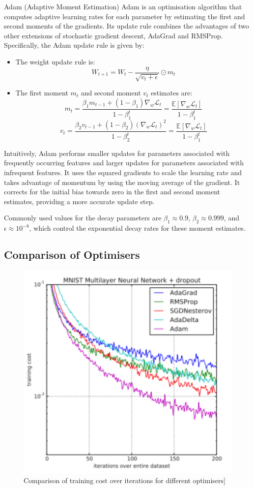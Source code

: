 \begin{definitionbox}{Adam (Adaptive Moment Estimation)}
Adam is an optimisation algorithm that computes adaptive learning rates for each parameter by estimating the first and second moments of the gradients. Its update rule combines the advantages of two other extensions of stochastic gradient descent, AdaGrad and RMSProp. Specifically, the Adam update rule is given by:
\begin{itemize}
    \item The weight update rule is:
    \[ W_{t+1} = W_t - \frac{\eta}{\sqrt{v_t + \epsilon}} \odot m_t \]
    \item The first moment \( m_t \) and second moment \( v_t \) estimates are:
    \[ m_t = \frac{\beta_1 m_{t-1} + (1 - \beta_1) \nabla_w \mathcal{L}_t}{1 - \beta_1^t} = \frac{\mathbb{E}\left[ \nabla_w \mathcal{L}_t\right]}{1 - \beta_1^t} \]
    \[ v_t = \frac{\beta_2 v_{t-1} + (1 - \beta_2) (\nabla_w \mathcal{L}_t)^2}{1 - \beta_2^t} = \frac{\mathbb{E}\left[ \nabla_w \mathcal{L}_t\right]}{1 - \beta_1^t} \]
\end{itemize}
Intuitively, Adam performs smaller updates for parameters associated with frequently occurring features and larger updates for parameters associated with infrequent features. It uses the squared gradients to scale the learning rate and takes advantage of momentum by using the moving average of the gradient. It corrects for the initial bias towards zero in the first and second moment estimates, providing a more accurate update step.

Commonly used values for the decay parameters are \( \beta_1 \approx 0.9 \), \( \beta_2 \approx 0.999 \), and \( \epsilon \approx 10^{-8} \), which control the exponential decay rates for these moment estimates.
\end{definitionbox}

\subsection{Comparison of Optimisers}
\begin{figure}[H]
    \centering
    \includegraphics[width=0.5\linewidth]{img/optimisers.png}
    \caption{Comparison of training cost over iterations for different optimisers]}
    
\end{figure}

